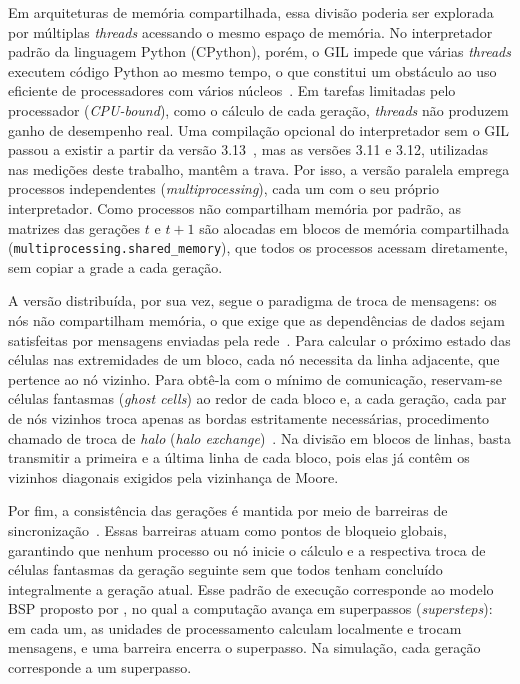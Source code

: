 Em arquiteturas de memória compartilhada, essa divisão poderia ser explorada por múltiplas \textit{threads} acessando o mesmo espaço de memória. No interpretador padrão da linguagem Python (CPython), porém, o \ac{GIL} impede que várias \textit{threads} executem código Python ao mesmo tempo, o que constitui um obstáculo ao uso eficiente de processadores com vários núcleos~\cite{Gross2023}. Em tarefas limitadas pelo processador (\textit{CPU-bound}), como o cálculo de cada geração, \textit{threads} não produzem ganho de desempenho real. Uma compilação opcional do interpretador sem o \ac{GIL} passou a existir a partir da versão 3.13~\cite{Gross2023}, mas as versões 3.11 e 3.12, utilizadas nas medições deste trabalho, mantêm a trava. Por isso, a versão paralela emprega processos independentes (\textit{multiprocessing}), cada um com o seu próprio interpretador. Como processos não compartilham memória por padrão, as matrizes das gerações $t$ e $t+1$ são alocadas em blocos de memória compartilhada (\texttt{multiprocessing.shared\_memory}), que todos os processos acessam diretamente, sem copiar a grade a cada geração.

A versão distribuída, por sua vez, segue o paradigma de troca de mensagens: os nós não compartilham memória, o que exige que as dependências de dados sejam satisfeitas por mensagens enviadas pela rede~\cite{Tanenbaum2017}.
Para calcular o próximo estado das células nas extremidades de um bloco, cada nó necessita da linha adjacente, que pertence ao nó vizinho. Para obtê-la com o mínimo de comunicação, reservam-se células fantasmas (\textit{ghost cells}) ao redor de cada bloco e, a cada geração, cada par de nós vizinhos troca apenas as bordas estritamente necessárias, procedimento chamado de troca de \textit{halo} (\textit{halo exchange})~\cite{Kjolstad2010}. Na divisão em blocos de linhas, basta transmitir a primeira e a última linha de cada bloco, pois elas já contêm os vizinhos diagonais exigidos pela vizinhança de Moore.

Por fim, a consistência das gerações é mantida por meio de barreiras de sincronização~\cite{Pacheco2011}.
Essas barreiras atuam como pontos de bloqueio globais, garantindo que nenhum processo ou nó inicie o cálculo e a respectiva troca de células fantasmas da geração seguinte sem que todos tenham concluído integralmente a geração atual. Esse padrão de execução corresponde ao modelo \ac{BSP} proposto por , no qual a computação avança em superpassos (\textit{supersteps}): em cada um, as unidades de processamento calculam localmente e trocam mensagens, e uma barreira encerra o superpasso. Na simulação, cada geração corresponde a um superpasso.

